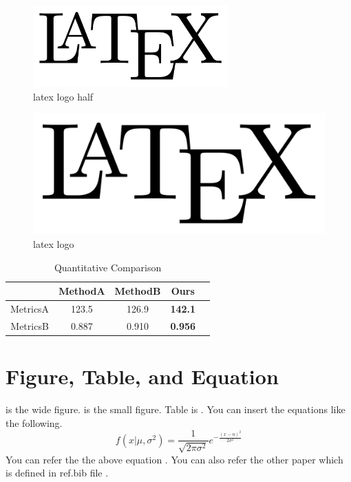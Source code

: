 \begin{figure}[t]
  \begin{center}
    \includegraphics[width=7.5cm]{figs/latex_logo.png}
    \caption{latex logo half}
    \label{fig:latex_logo_half}
  \end{center}
\end{figure}

\begin{figure}[t]
\centering
    \includegraphics[width=\textwidth]{./figs/latex_logo.png}
    \caption{latex logo}
    \label{fig:latex_logo}
\end{figure}

\begin{table}[t]
    \centering
\caption{Quantitative Comparison}
\label{tab:quantitative_eval}
\begin{tabular}{ccccc}
    \toprule
& MethodA & MethodB & Ours \\
    \midrule
MetricsA & 123.5 & 126.9 & {\bf 142.1} \\
MetricsB & 0.887 & 0.910 & {\bf 0.956} \\
\bottomrule
\end{tabular}
\end{table}

\section{Figure, Table, and Equation}
 is the wide figure.
 is the small figure.
Table is .
You can insert the equations like the following.
%
\begin{equation}
\label{eq:gauss}
f(x | \mu, \sigma^2) = \frac{1}{\sqrt{2 \pi \sigma^2}} e^{-\frac{(x - u)^2}{2 \sigma^2}}
\end{equation}
You can refer the the above equation .
%
You can also refer the other paper which is defined in ref.bib file \cite{goodfellow2014generative}.